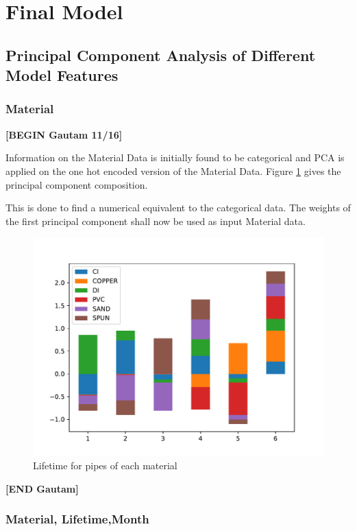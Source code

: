 \documentclass[twocolumn]{article}
\begin{document}
\section{Final Model}



\subsection{Principal Component Analysis of Different Model Features}

\subsubsection{Material}

\textbf{[BEGIN Gautam 11/16]}

Information on the Material Data is initially found to be categorical and PCA is applied on the one hot encoded version of the Material Data. Figure \ref{fig:Material PCA} gives the principal component composition.

This is done to find a numerical equivalent to the categorical data. The weights of the first principal component shall now be used as input Material data.

\begin{figure}
    \includegraphics[width=\columnwidth]{Gautam/mat.pdf}
    \caption{Lifetime for pipes of each material}
    \label{fig:Material PCA}
\end{figure}
\textbf{[END Gautam]}




\subsubsection{Material, Lifetime,Month}
\end{document}
